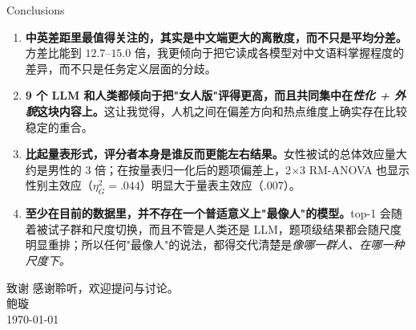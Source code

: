 \documentclass[aspectratio=169,professionalfonts]{beamer}
\begin{document}
\begin{frame}{Conclusions}
  \footnotesize
  \begin{enumerate}
    \item \textbf{中英差距里最值得关注的，其实是中文端更大的离散度，而不只是平均分差。}方差比能到 $12.7$--$15.0$ 倍，我更倾向于把它读成各模型对中文语料掌握程度的差异，而不只是任务定义层面的分歧。
    \item \textbf{9 个 LLM 和人类都倾向于把"女人版"评得更高，而且共同集中在\emph{性化 + 外貌}这块内容上。}这让我觉得，人机之间在偏差方向和热点维度上确实存在比较稳定的重合。
    \item \textbf{比起量表形式，评分者本身是谁反而更能左右结果。}女性被试的总体效应量大约是男性的 3 倍；在按量表归一化后的题项偏差上，2$\times$3 RM-ANOVA 也显示性别主效应（$\eta_G^2=.044$）明显大于量表主效应（$.007$）。
    \item \textbf{至少在目前的数据里，并不存在一个普适意义上"最像人"的模型。}top-1 会随着被试子群和尺度切换，而且不管是人类还是 LLM，题项级结果都会随尺度明显重排；所以任何"最像人"的说法，都得交代清楚是\emph{像哪一群人、在哪一种尺度下。}
  \end{enumerate}

\end{frame}

\begin{frame}{致谢}
  \centering
  \vspace{1em}
  \Large 感谢聆听，欢迎提问与讨论。\\[0.5em]
  \normalsize 鲍璇\\ \today
\end{frame}
\end{document}
